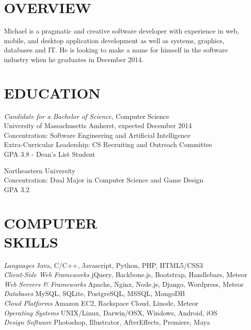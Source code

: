 \documentclass[line,margin]{res}
\begin{document}
\address{169F Brittany Mnr, Amherst, MA 01002}
\address{(781) 264-6283  --  mike@miketurley.com}


\begin{resume}
 
\section{OVERVIEW}
    Michael is a pragmatic and creative software developer with experience in web, mobile, and desktop application development as well as systems, graphics, databases and IT.  He is looking to make a name for himself in the software industry when he graduates in December 2014.
 
 
\section{EDUCATION}
    {\sl Candidate for a Bachelor of Science,} Computer Science \\
    University of Massachusetts Amherst, 
    expected December 2014 \\
    Concentration: Software Engineering and Artificial Intelligence \\
    Extra-Curricular Leadership: CS Recruiting and Outreach Committee \\
    GPA 3.8 - Dean's List Student

    Northeastern University \\
    Concentration: Dual Major in Computer Science and Game Design \\
    GPA 3.2
 
 
\section{COMPUTER \\ SKILLS}
    {\sl Languages} \hfill Java, C/C++, Javascript, Python, PHP, HTML5/CSS3 \\
    {\sl Client-Side Web Frameworks} \hfill jQuery, Backbone.js, Bootstrap, Handlebars, Meteor \\
    {\sl Web Servers \& Frameworks} \hfill Apache, Nginx, Node.js, Django, Wordpress, Meteor \\
    {\sl Databases} \hfill MySQL, SQLite, PostgreSQL, MSSQL, MongoDB \\
    {\sl Cloud Platforms} \hfill Amazon EC2, Rackspace Cloud, Linode, Meteor \\
    {\sl Operating Systems} \hfill UNIX/Linux, Darwin/OSX, Windows, Android, iOS \\
    {\sl Design Software} \hfill Photoshop, Illustrator, AfterEffects, Premiere, Maya
 

\end{resume}
\end{document}

